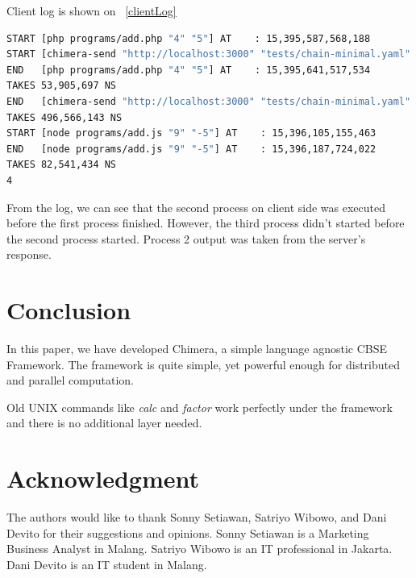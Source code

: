 \documentclass[conference]{IEEEtran}
\begin{document}
Client log is shown on ~\ref{clientLog} 

\begin{lstlisting}[caption=Client Log, label=clientLog, language=bash, basicstyle=\small, breaklines=true]
START [php programs/add.php "4" "5"] AT    : 15,395,587,568,188
START [chimera-send "http://localhost:3000" "tests/chain-minimal.yaml" "4" "5"] AT    : 15,395,607,233,624
END   [php programs/add.php "4" "5"] AT    : 15,395,641,517,534
TAKES 53,905,697 NS
END   [chimera-send "http://localhost:3000" "tests/chain-minimal.yaml" "4" "5"] AT    : 15,396,103,823,215
TAKES 496,566,143 NS
START [node programs/add.js "9" "-5"] AT    : 15,396,105,155,463
END   [node programs/add.js "9" "-5"] AT    : 15,396,187,724,022
TAKES 82,541,434 NS
4
\end{lstlisting}

From the log, we can see that the second process on client side was executed before the first process finished.
However, the third process didn't started before the second process started. Process 2 output was taken from the
server's response.

\section{Conclusion}

In this paper, we have developed Chimera, a simple language agnostic CBSE Framework. 
The framework is quite simple, yet powerful enough for distributed and parallel computation.

Old UNIX commands like {\it calc} and {\it factor} work perfectly under the framework and
there is no additional layer needed.


\section*{Acknowledgment}

The authors would like to thank Sonny Setiawan, Satriyo Wibowo, and Dani Devito for
their suggestions and opinions. Sonny Setiawan is a Marketing Business Analyst in Malang.
Satriyo Wibowo is an IT professional in Jakarta. Dani Devito is an IT student in Malang.

\ifCLASSOPTIONcaptionsoff
  \newpage
\fi




\end{document}
